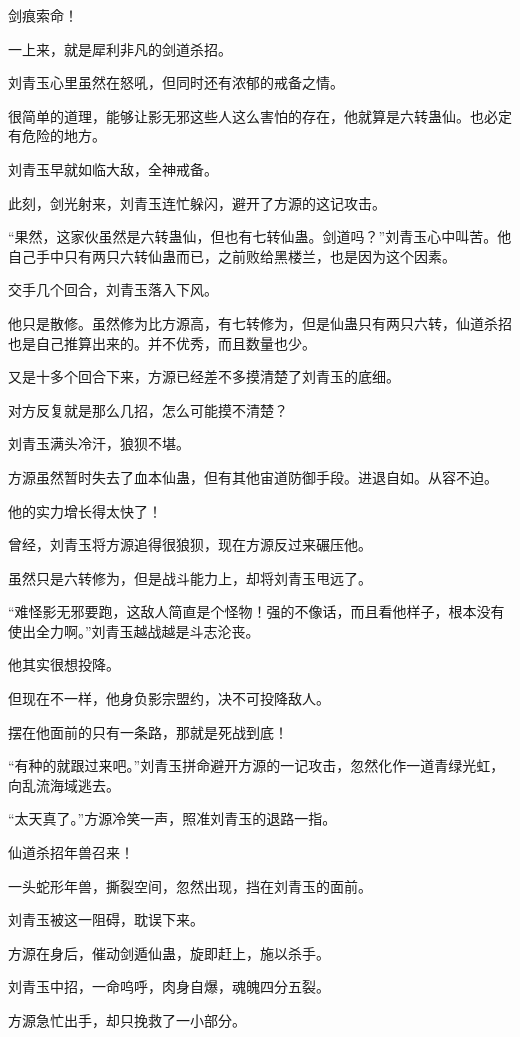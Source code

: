 \begin{this_body}
剑痕索命！

一上来，就是犀利非凡的剑道杀招。

刘青玉心里虽然在怒吼，但同时还有浓郁的戒备之情。

很简单的道理，能够让影无邪这些人这么害怕的存在，他就算是六转蛊仙。也必定有危险的地方。

刘青玉早就如临大敌，全神戒备。

此刻，剑光射来，刘青玉连忙躲闪，避开了方源的这记攻击。

“果然，这家伙虽然是六转蛊仙，但也有七转仙蛊。剑道吗？”刘青玉心中叫苦。他自己手中只有两只六转仙蛊而已，之前败给黑楼兰，也是因为这个因素。

交手几个回合，刘青玉落入下风。

他只是散修。虽然修为比方源高，有七转修为，但是仙蛊只有两只六转，仙道杀招也是自己推算出来的。并不优秀，而且数量也少。

又是十多个回合下来，方源已经差不多摸清楚了刘青玉的底细。

对方反复就是那么几招，怎么可能摸不清楚？

刘青玉满头冷汗，狼狈不堪。

方源虽然暂时失去了血本仙蛊，但有其他宙道防御手段。进退自如。从容不迫。

他的实力增长得太快了！

曾经，刘青玉将方源追得很狼狈，现在方源反过来碾压他。

虽然只是六转修为，但是战斗能力上，却将刘青玉甩远了。

“难怪影无邪要跑，这敌人简直是个怪物！强的不像话，而且看他样子，根本没有使出全力啊。”刘青玉越战越是斗志沦丧。

他其实很想投降。

但现在不一样，他身负影宗盟约，决不可投降敌人。

摆在他面前的只有一条路，那就是死战到底！

“有种的就跟过来吧。”刘青玉拼命避开方源的一记攻击，忽然化作一道青绿光虹，向乱流海域逃去。

“太天真了。”方源冷笑一声，照准刘青玉的退路一指。

仙道杀招年兽召来！

一头蛇形年兽，撕裂空间，忽然出现，挡在刘青玉的面前。

刘青玉被这一阻碍，耽误下来。

方源在身后，催动剑遁仙蛊，旋即赶上，施以杀手。

刘青玉中招，一命呜呼，肉身自爆，魂魄四分五裂。

方源急忙出手，却只挽救了一小部分。


\end{this_body}
